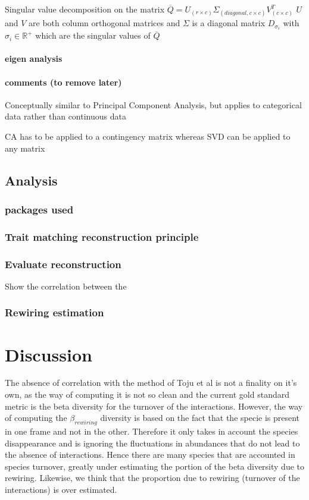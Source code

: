 \documentclass{article}
\begin{document}
Singular value decomposition on the matrix $\overline{Q} = U_{(r\times c)} \Sigma_{(diagonal, c\times c)} V_{(c \times c)}^T$ 
$U$ and $V$ are both column orthogonal matrices and $\Sigma$ is a diagonal matrix $D_{\sigma_i}$ with $\sigma_i \in \mathbb{R}^+$ which are the singular values of $\overline{Q}$


\paragraph{eigen analysis}

\paragraph{comments (to remove later)}
Conceptually similar to Principal Component Analysis, but applies to categorical data rather than continuous data

CA has to be applied to a contingency matrix whereas SVD can be applied to any matrix

\subsection{Analysis}

\subsubsection{packages used}

\subsubsection{Trait matching reconstruction principle}

\subsubsection{Evaluate reconstruction}

Show the correlation between the 

\subsubsection{Rewiring estimation}

\section{Discussion}

The absence of correlation with the method of Toju et al is not a finality on it's own, as the way of computing it is not so clean and the current gold standard metric is the beta diversity for the turnover of the interactions. However, the way of computing the $\beta_{rewiring}$ diversity is based on the fact that the specie is present in one frame and not in the other. Therefore it only takes in account the species disappearance and is ignoring the fluctuations in abundances that do not lead to the absence of interactions. Hence there are many species that are accounted in species turnover, greatly under estimating the portion of the beta diversity due to rewiring. Likewise, we think that the proportion due to rewiring (turnover of the interactions) is over estimated.
\end{document}
